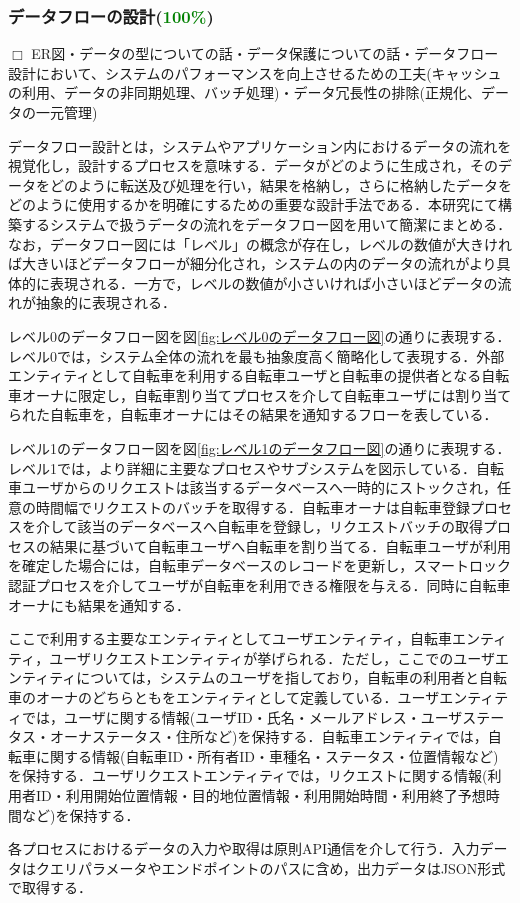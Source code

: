       \subsubsection{データフローの設計(\textcolor{green}{100\%})}
        \label{sec:データフローの設計}
          \par $\Box$ ER図・データの型についての話・データ保護についての話・データフロー設計において、システムのパフォーマンスを向上させるための工夫(キャッシュの利用、データの非同期処理、バッチ処理)・データ冗長性の排除(正規化、データの一元管理)
          \par データフロー設計とは，システムやアプリケーション内におけるデータの流れを視覚化し，設計するプロセスを意味する．データがどのように生成され，そのデータをどのように転送及び処理を行い，結果を格納し，さらに格納したデータをどのように使用するかを明確にするための重要な設計手法である．本研究にて構築するシステムで扱うデータの流れをデータフロー図を用いて簡潔にまとめる．なお，データフロー図には「レベル」の概念が存在し，レベルの数値が大きければ大きいほどデータフローが細分化され，システムの内のデータの流れがより具体的に表現される．一方で，レベルの数値が小さいければ小さいほどデータの流れが抽象的に表現される．
          \par レベル0のデータフロー図を図\ref{fig:レベル0のデータフロー図}の通りに表現する．レベル0では，システム全体の流れを最も抽象度高く簡略化して表現する．外部エンティティとして自転車を利用する自転車ユーザと自転車の提供者となる自転車オーナに限定し，自転車割り当てプロセスを介して自転車ユーザには割り当てられた自転車を，自転車オーナにはその結果を通知するフローを表している．
          \par レベル1のデータフロー図を図\ref{fig:レベル1のデータフロー図}の通りに表現する．レベル1では，より詳細に主要なプロセスやサブシステムを図示している．自転車ユーザからのリクエストは該当するデータベースへ一時的にストックされ，任意の時間幅でリクエストのバッチを取得する．自転車オーナは自転車登録プロセスを介して該当のデータベースへ自転車を登録し，リクエストバッチの取得プロセスの結果に基づいて自転車ユーザへ自転車を割り当てる．自転車ユーザが利用を確定した場合には，自転車データベースのレコードを更新し，スマートロック認証プロセスを介してユーザが自転車を利用できる権限を与える．同時に自転車オーナにも結果を通知する．
          \par ここで利用する主要なエンティティとしてユーザエンティティ，自転車エンティティ，ユーザリクエストエンティティが挙げられる．ただし，ここでのユーザエンティティについては，システムのユーザを指しており，自転車の利用者と自転車のオーナのどちらともをエンティティとして定義している．ユーザエンティティでは，ユーザに関する情報(ユーザID・氏名・メールアドレス・ユーザステータス・オーナステータス・住所など)を保持する．自転車エンティティでは，自転車に関する情報(自転車ID・所有者ID・車種名・ステータス・位置情報など)を保持する．ユーザリクエストエンティティでは，リクエストに関する情報(利用者ID・利用開始位置情報・目的地位置情報・利用開始時間・利用終了予想時間など)を保持する．
          \par 各プロセスにおけるデータの入力や取得は原則API通信を介して行う．入力データはクエリパラメータやエンドポイントのパスに含め，出力データはJSON形式で取得する．

